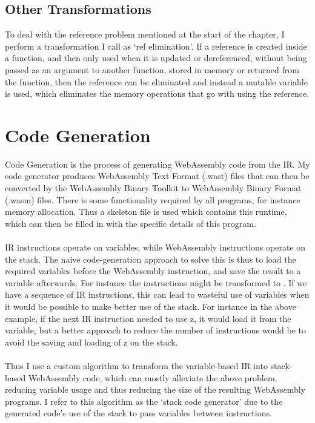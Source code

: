 \subsection{Other Transformations}
To deal with the reference problem mentioned at the start of the chapter, I perform a transformation I call as `ref elimination'. If a reference is created inside a function, and then only used when it is updated or dereferenced, without being passed as an argument to another function, stored in memory or returned from the function, then the reference can be eliminated and instead a mutable variable is used, which eliminates the memory operations that go with using the reference.


\section{Code Generation}

Code Generation is the process of generating WebAssembly code from the IR. My code generator produces WebAssembly Text Format (.wast) files that can then be converted by the WebAssembly Binary Toolkit to WebAssembly Binary Format (.wasm) files. There is some functionality required by all programs, for instance memory allocation. Thus a skeleton file is used which contains this runtime, which can then be filled in with the specific details of this program.
\\\\
IR instructions operate on variables, while WebAssembly instructions operate on the stack. The naive code-generation approach to solve this is thus to load the required variables before the WebAssembly instruction, and save the result to a variable afterwards. For instance the instructions  might be transformed to . If we have a sequence of IR instructions, this can lead to wasteful use of variables when it would be possible to make better use of the stack. For instance in the above example, if the next IR instruction needed to use z, it would load it from the variable, but a better approach to reduce the number of instructions would be to avoid the saving and loading of z on the stack.
\\\\
Thus I use a custom algorithm to transform the variable-based IR into stack-based WebAssembly code, which can mostly alleviate the above problem, reducing variable usage and thus reducing the size of the resulting WebAssembly programs. I refer to this algorithm as the `stack code generator' due to the generated code's use of the stack to pass variables between instructions.

